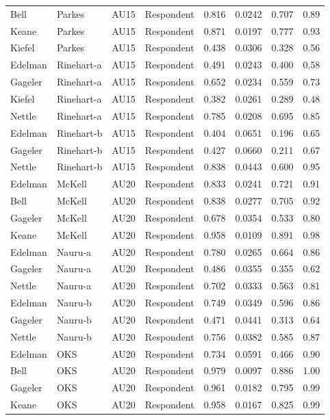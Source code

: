 \documentclass{monashthesis}
\begin{document}
\begin{center}
\begin{longtable}{llllllll}
Bell & Parkes & AU15 & Respondent & 0.816 & 0.0242 & 0.707 & 0.89 \\
Keane & Parkes & AU15 & Respondent & 0.871 & 0.0197 & 0.777 & 0.93 \\
Kiefel & Parkes & AU15 & Respondent & 0.438 & 0.0306 & 0.328 & 0.56 \\
Edelman & Rinehart-a & AU15 & Respondent & 0.491 & 0.0243 & 0.400 & 0.58 \\
Gageler & Rinehart-a & AU15 & Respondent & 0.652 & 0.0234 & 0.559 & 0.73 \\
Kiefel & Rinehart-a & AU15 & Respondent & 0.382 & 0.0261 & 0.289 & 0.48 \\
Nettle & Rinehart-a & AU15 & Respondent & 0.785 & 0.0208 & 0.695 & 0.85 \\
Edelman & Rinehart-b & AU15 & Respondent & 0.404 & 0.0651 & 0.196 & 0.65 \\
Gageler & Rinehart-b & AU15 & Respondent & 0.427 & 0.0660 & 0.211 & 0.67 \\
Nettle & Rinehart-b & AU15 & Respondent & 0.838 & 0.0443 & 0.600 & 0.95 \\
Edelman & McKell & AU20 & Respondent & 0.833 & 0.0241 & 0.721 & 0.91 \\
Bell & McKell & AU20 & Respondent & 0.838 & 0.0277 & 0.705 & 0.92 \\
Gageler & McKell & AU20 & Respondent & 0.678 & 0.0354 & 0.533 & 0.80 \\
Keane & McKell & AU20 & Respondent & 0.958 & 0.0109 & 0.891 & 0.98 \\
Edelman & Nauru-a & AU20 & Respondent & 0.780 & 0.0265 & 0.664 & 0.86 \\
Gageler & Nauru-a & AU20 & Respondent & 0.486 & 0.0355 & 0.355 & 0.62 \\
Nettle & Nauru-a & AU20 & Respondent & 0.702 & 0.0333 & 0.563 & 0.81 \\
Edelman & Nauru-b & AU20 & Respondent & 0.749 & 0.0349 & 0.596 & 0.86 \\
Gageler & Nauru-b & AU20 & Respondent & 0.471 & 0.0441 & 0.313 & 0.64 \\
Nettle & Nauru-b & AU20 & Respondent & 0.756 & 0.0382 & 0.585 & 0.87 \\
Edelman & OKS & AU20 & Respondent & 0.734 & 0.0591 & 0.466 & 0.90 \\
Bell & OKS & AU20 & Respondent & 0.979 & 0.0097 & 0.886 & 1.00 \\
Gageler & OKS & AU20 & Respondent & 0.961 & 0.0182 & 0.795 & 0.99 \\
Keane & OKS & AU20 & Respondent & 0.958 & 0.0167 & 0.825 & 0.99 \\

\end{longtable}
\end{center}
\end{document}
